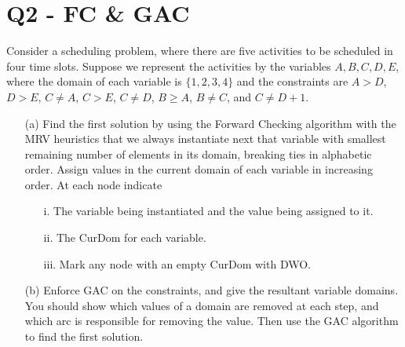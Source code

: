 \documentclass[a4paper, 11pt]{article}
\begin{document}
\newpage
\section{Q2 - FC \& GAC}
\begin{question}\normalfont
    Consider a scheduling problem, where there are five activities to be scheduled in four time slots. Suppose we represent the activities by the variables $A, B,  C, D, E$, where the domain of each variable is $\{1,2,3,4\}$ and the constraints are $A > D$, $D > E$, $C \ne A$, $C > E$, $C \ne D$, $B \geq A$, $B \ne C$, and $C \ne D + 1$.
    \begin{itemize}
    \item [(a)] Find the first solution by using the Forward Checking algorithm with the MRV heuristics that we always instantiate next that variable with smallest remaining number of elements in its domain, breaking ties in alphabetic order. Assign values in the current domain of each variable in increasing order. At each node indicate
    \begin{itemize}
        \item [i.] The variable being instantiated and the value being assigned to it.
        \item [ii.] The CurDom for each variable.
        \item [iii.] Mark any node with an empty CurDom with DWO.
    \end{itemize}
    \item [(b)] Enforce GAC on the constraints, and give the resultant variable domains. You should show which values of a domain are removed at each step, and which arc is responsible for removing the value. Then use the GAC algorithm to find the first solution.
    \end{itemize}
\end{question}
\end{document}
